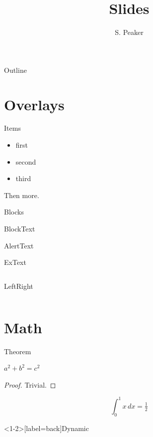 \documentclass{beamer}
\title{Slides}\author{S. Peaker}\date{}
\begin{document}
\begin{frame}\titlepage\end{frame}
\begin{frame}{Outline}\tableofcontents\end{frame}
\section{Overlays}
\begin{frame}{Items}
\begin{itemize}[<+->]\item first \item second \item \alert{third}\end{itemize}
\pause Then more.
\end{frame}
\begin{frame}[fragile]{Blocks}
\begin{block}{Block}Text\end{block}\begin{alertblock}{Alert}Text\end{alertblock}\begin{exampleblock}{Ex}Text\end{exampleblock}
\begin{columns}LeftRight\end{columns}
\end{frame}
\section{Math}
\begin{frame}{Theorem}\begin{theorem}$a^2+b^2=c^2$\end{theorem}\begin{proof}Trivial.\end{proof}
\[\int_0^1 x\,dx=\tfrac12\]
\end{frame}
\begin{frame}<1-2>[label=back]{Dynamic}\end{frame}
\end{document}
